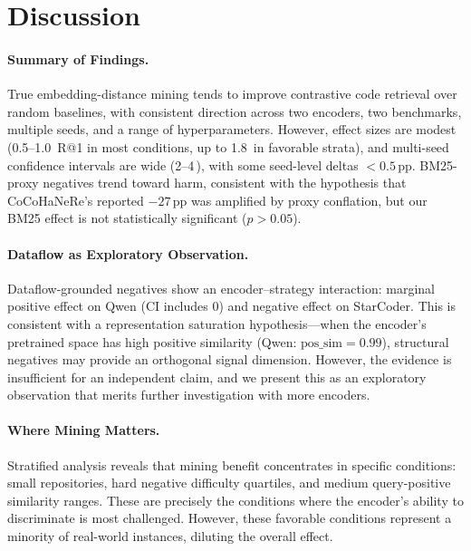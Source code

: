 \documentclass[11pt]{article}
\newcommand{\pp}{\,\text{pp}}
\begin{document}
\section{Discussion}
\label{sec:discussion}

\paragraph{Summary of Findings.}
True embedding-distance mining tends to improve contrastive code retrieval over random baselines, with consistent direction across two encoders, two benchmarks, multiple seeds, and a range of hyperparameters.
However, effect sizes are modest (0.5--1.0\pp{} R@1 in most conditions, up to 1.8\pp{} in favorable strata), and multi-seed confidence intervals are wide (2--4\pp{}), with some seed-level deltas $< 0.5\pp$.
BM25-proxy negatives trend toward harm, consistent with the hypothesis that CoCoHaNeRe's reported $-27\pp{}$ was amplified by proxy conflation, but our BM25 effect is not statistically significant ($p > 0.05$).

\paragraph{Dataflow as Exploratory Observation.}
Dataflow-grounded negatives show an encoder--strategy interaction: marginal positive effect on Qwen (CI includes 0) and negative effect on StarCoder.
This is consistent with a representation saturation hypothesis---when the encoder's pretrained space has high positive similarity (Qwen: $\text{pos\_sim} = 0.99$), structural negatives may provide an orthogonal signal dimension.
However, the evidence is insufficient for an independent claim, and we present this as an exploratory observation that merits further investigation with more encoders.

\paragraph{Where Mining Matters.}
Stratified analysis reveals that mining benefit concentrates in specific conditions: small repositories, hard negative difficulty quartiles, and medium query-positive similarity ranges.
These are precisely the conditions where the encoder's ability to discriminate is most challenged.
However, these favorable conditions represent a minority of real-world instances, diluting the overall effect.
\end{document}
